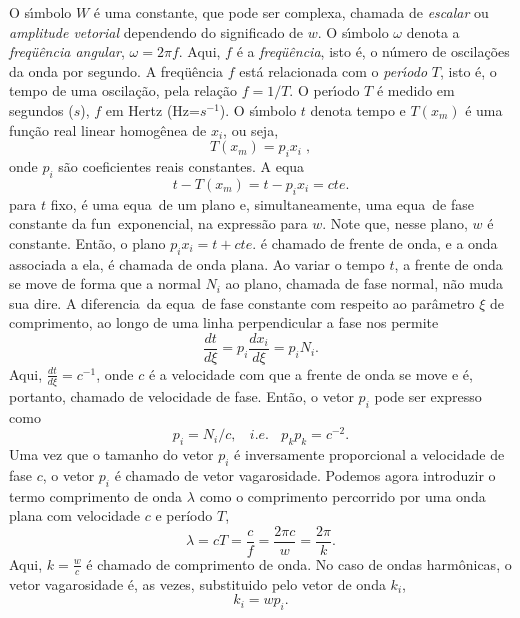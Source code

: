 O s\'{\i}mbolo $W$ \'e uma constante, que pode ser complexa,
chamada de {\it escalar} ou {\it amplitude vetorial} dependendo do
significado de $w$. O s\'{\i}mbolo $\omega$ denota a {\it
freq\"u\^encia angular}, $\omega = 2\pi f$. Aqui, $f$ \'e a {\it
freq\"u\^encia}, isto \'e, o n\'umero de oscila\c{c}\~oes da onda
por segundo. A freq\"u\^encia $f$ est\'a relacionada com o {\it
per\'{\i}odo} $T$, isto \'e, o tempo de uma oscila\c{c}\~ao, pela
rela\c{c}\~ao $f = 1/T$. O per\'{\i}odo $T$ \'e medido em segundos
($s$), $f$ em Hertz (Hz=$s^{-1}$). O s\'{\i}mbolo $t$ denota tempo
e $T(x_m)$ \'e uma fun\c{c}\~ao real linear homog\^enea de $x_i$,
ou seja,
\begin{equation}
T(x_m)=p_i x_i \;,
\end{equation}
onde $p_i$ s\~ao coeficientes reais constantes. A equa\cao\
\begin{equation}
t-T(x_m)=t-p_i x_i=cte.
\end{equation}
para $t$ fixo, \'e uma equa\cao\ de um plano e, simultaneamente,
uma equa\cao\ de fase constante da fun\cao\ exponencial,
na express\~ao para $w$. Note que, nesse plano, $w$ \'e constante.
Ent\~ao, o plano $p_i x_i=t+cte.$ \'e chamado de frente de onda, e
a onda associada a ela, \'e chamada de onda plana.
Ao variar o tempo $t$, a frente de onda se move de forma que
a normal $N_i$ ao plano, chamada de fase normal, n\~ao muda
sua dire\cao. A diferencia\cao\ da equa\cao\ de fase constante
com respeito ao par\^ametro $\xi$ de comprimento, ao longo de
uma linha perpendicular a fase nos permite
\begin{equation}
\frac{dt}{d\xi}=p_i \frac{dx_i}{d\xi}=p_i N_i .
\end{equation}
Aqui, $\frac{dt}{d\xi}=c^{-1}$, onde $c$ \'e a velocidade com que a frente
de onda se move e \'e, portanto, chamado de velocidade
de fase. Ent\~ao, o vetor $p_i$ pode ser expresso como
\begin{equation}
p_i =N_i / c , \ \ \ \  i.e. \ \ \ \  p_k p_k = c^{-2}.
\end{equation}
Uma vez que o tamanho do vetor $p_i$ \'e inversamente
proporcional a velocidade de fase $c$, o vetor $p_i$
\'e chamado de vetor vagarosidade. Podemos agora
introduzir o termo comprimento de onda $\lambda$
como o comprimento percorrido por uma onda plana
com velocidade $c$ e per\'iodo $T$,
\begin{equation}
\lambda=cT=\frac{c}{f}=\frac{2\pi c}{w} = \frac{2\pi}{k} .
\end{equation}
Aqui, $k=\frac{w}{c}$ \'e chamado de comprimento de onda.
No caso de ondas harm\^onicas, o vetor vagarosidade \'e,
as vezes, substituido pelo vetor de onda $k_i$,
\begin{equation}
k_i=wp_i .
\end{equation}

